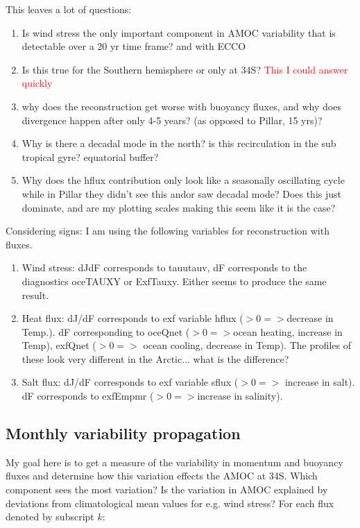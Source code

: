 \documentclass[a4paper,11pt]{article}
\newcommand{\red}[1]{\textcolor{red}{#1}}
\begin{document}
  This leaves a lot of questions: 
  \begin{enumerate}
	\item Is wind stress the only important component in AMOC variability that is detectable over a 20 yr time frame? and with ECCO
	\item Is this true for the Southern hemisphere or only at 34S? \red{This I could answer quickly} 
	\item why does the reconstruction get worse with buoyancy fluxes, and why does divergence happen after only 4-5 years? (as opposed to Pillar, 15 yrs)?
	\item Why is there a decadal mode in the north? is this recirculation in the sub tropical gyre? equatorial buffer? 
	\item Why does the hflux contribution only look like a seasonally oscillating cycle while in Pillar they didn't see this andor saw decadal mode? Does this just dominate, and are my plotting scales making this seem like it is the case? 
 \end{enumerate}

  Considering signs: I am using the following variables for reconstruction with fluxes. 
  \begin{enumerate}
	\item Wind stress: dJdF corresponds to tauutauv, dF corresponds to the diagnostics oceTAUXY or ExfTauxy. Either seems to produce the same result. 
	\item Heat flux: dJ/dF corresponds to exf variable hflux ($>0 => $decrease in Temp.). dF corresponding to oceQnet ($>0 => $ocean heating, increase in Temp), exfQnet ($>0 =>$ ocean cooling, decrease in Temp). The profiles of these look very different in the Arctic... what is the difference? 
	\item Salt flux: dJ/dF corresponds to exf variable sflux ($>0 =>$ increase in salt). dF corresponds to exfEmpmr ($>0 => $increase in salinity). 
  \end{enumerate}

  \subsection{Monthly variability propagation}

  My goal here is to get a measure of the variability in momentum and buoyancy fluxes and determine how this variation effects the AMOC at 34S. Which component sees the most variation? Is the variation in AMOC explained by deviations from climatological mean values for e.g. wind stress? For each flux denoted by subscript $k$:
\end{document}
